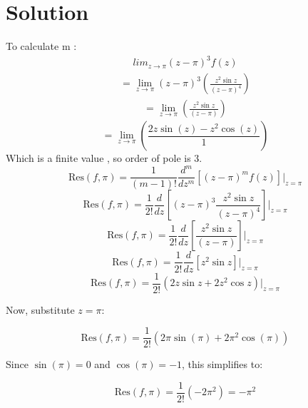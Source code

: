 \documentclass[journal,12pt,twocolumn]{IEEEtran}
\theoremstyle{remark}
\begin{document}
\section{Solution}

To calculate m :
\begin{align}
lim_{{z \to \pi}} (z-\pi)^3 f(z) 
\end{align}
\begin{align}
= \lim_{{z \to \pi}} (z-\pi)^3 \left( \frac{{ z^2 \sin z}}{{(z-\pi)^4}} \right)
\end{align}
\begin{align}
= \lim_{{z \to \pi}}  \left( \frac{{ z^2 \sin z}}{{(z-\pi)}} \right)
\end{align}
\begin{equation}
= \lim_{{z \to \pi}}  \left( \frac{2z \sin(z) - z^2 \cos(z)}{1} \right)
\end{equation}
Which is a finite value , so order of pole is 3.
\begin{equation}
\text{Res}(f, \pi) = \frac{1}{(m-1)!} \frac{d^{m}}{dz^{m}} \left[ (z-\pi)^m f(z) \right] \Bigg|_{z=\pi}
\end{equation}
\begin{equation}
\text{Res}(f,\pi) = \frac{1}{2!} \frac{d}{dz} \left[ (z-\pi)^3 \frac{z^2 \sin z}{(z-\pi)^4} \right] \Bigg|_{z=\pi}
\end{equation}
\begin{equation}
\text{Res}(f,\pi) = \frac{1}{2!} \frac{d}{dz} \left[ \frac{z^2 \sin z}{(z-\pi)} \right] \Bigg|_{z=\pi}
\end{equation}
\begin{equation}
\text{Res}(f,\pi) = \frac{1}{2!} \frac{d}{dz} \left[ z^2 \sin z \right] \Bigg|_{z=\pi}
\end{equation}
\begin{equation}
\text{Res}(f,\pi) = \frac{1}{2!} \left( 2z \sin z + 2z^2 \cos z \right) \Bigg|_{z=\pi}
\end{equation}

Now, substitute \( z=\pi \):

\begin{equation}
\text{Res}(f,\pi) = \frac{1}{2!} \left( 2\pi \sin(\pi) + 2\pi^2 \cos(\pi) \right)
\end{equation}

Since \( \sin(\pi) = 0 \) and \( \cos(\pi) = -1 \), this simplifies to:

\begin{equation}
\text{Res}(f,\pi) = \frac{1}{2!} (-2\pi^2) = -\pi^2
\end{equation}
\end{document}
